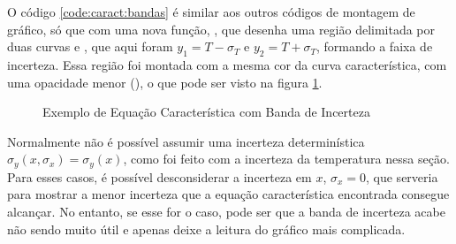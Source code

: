     O código \ref{code:caract:bandas} é similar aos outros códigos de montagem de gráfico, só que com uma nova função, , que desenha uma região delimitada por duas curvas  e , que aqui foram $y_1 = T - \sigma_T$ e $y_2 = T + \sigma_T$, formando a faixa de incerteza. Essa região foi montada com a mesma cor da curva característica, com uma opacidade menor (), o que pode ser visto na figura \ref{fig:caract:bandas}.

    \begin{figure}[H]
        \centering
        

        \caption{Exemplo de Equação Característica com Banda de Incerteza}
        \label{fig:caract:bandas}
    \end{figure}

    \begin{nota}
        Normalmente não é possível assumir uma incerteza determinística $\sigma_y(x, \sigma_x) = \sigma_y(x)$, como foi feito com a incerteza da temperatura nessa seção. Para esses casos, é possível desconsiderar a incerteza em $x$, $\sigma_x = 0$, que serveria para mostrar a menor incerteza que a equação característica encontrada consegue alcançar. No entanto, se esse for o caso, pode ser que a banda de incerteza acabe não sendo muito útil e apenas deixe a leitura do gráfico mais complicada.
    \end{nota}
